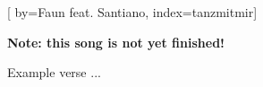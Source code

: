 

[%
    by={Faun feat. Santiano},
    index={tanzmitmir}]


    \label{tanzmitmir}

    \textbf{Note: this song is not yet finished!}

    \beginverse
        Example verse ...
    \endverse
\endsong
